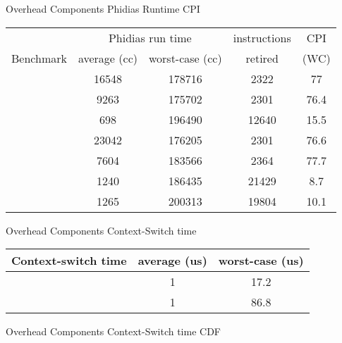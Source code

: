 \documentclass[10pt,hyperref={hyperfootnotes=false}, xcolor={usenames, dvipsnames}]{beamer}
\begin{document}
\begin{frame}[allowframebreaks]{Overhead Components} {Phidias Runtime CPI}
	\begin{table}[H]
	\centering
	\begin{longtable}{|c|c|c|c|c|}  
	\hline
					& \multicolumn{2}{|c|}{Phidias run time} & instructions	& CPI \\
	Benchmark		& average (cc)	&	worst-case (cc)	&	retired &	(WC) \\ \hline 
	\mcachepressure{}	& 16548	& 178716 & 2322 & 77 \\ \hline
	\mforkops{}		& 9263 & 175702 & 2301 & 76.4 \\ \hline
	\mfileops{}		& 698 & 196490 & 12640 & 15.5 \\ \hline
	\mhackbench{} 		& 23042 & 176205 & 2301 & 76.6 \\ \hline
	\mmmapops{} 		& 7604 & 183566 & 2364 & 77.7 \\ \hline
	\mstdout{} 			& 1240 & 186435 & 21429 & 8.7 \\ \hline
	\mthreadops{} 		& 1265 & 200313 & 19804 & 10.1 \\ \hline
	\end{longtable}
	\end{table}
\end{frame}

\begin{frame}[allowframebreaks]{Overhead Components} {Context-Switch time}
    \begin{table}[H]
	\centering
	\begin{longtable}{|c||c|c|}  
	\hline
		Context-switch time	&	average (us)	&	worst-case (us) \\ \hline \hline
		\mnoload{}				&	1				&		17.2 \\ \hline
		\mcachepressure{}		&	1				&		86.8 \\ \hline
	\end{longtable}
	\end{table}
\end{frame}

\begin{frame}[allowframebreaks]{Overhead Components} {Context-Switch time CDF}
    \begingroup
	
	\endgroup
\end{frame}
\end{document}
